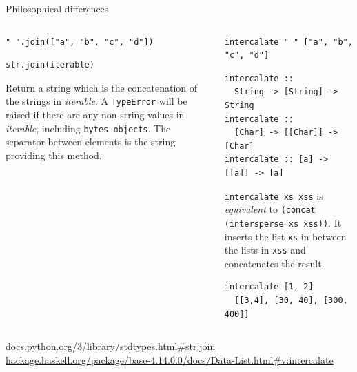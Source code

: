\documentclass[8pt]{beamer}
\begin{document}
\begin{frame}[fragile]{Philosophical differences}

\pause

\begin{columns}%
\begin{column}{.48\textwidth}
\begin{verbatim}
" ".join(["a", "b", "c", "d"])
\end{verbatim}
\pause
\begin{verbatim}
str.join(iterable)
\end{verbatim}

Return a string which is the concatenation of the strings in \emph{iterable}. A
\verb|TypeError| will be raised if there are any non-string values in \emph{iterable},
including \verb|bytes objects|. The separator between elements is the string providing
this method.


\end{column}
%
\begin{column}{.48\textwidth}
\pause
\begin{verbatim}
intercalate " " ["a", "b", "c", "d"]
\end{verbatim}

\pause
\begin{verbatim}
intercalate :: 
  String -> [String] -> String
intercalate :: 
  [Char] -> [[Char]] -> [Char]
intercalate :: [a] -> [[a]] -> [a]
\end{verbatim}

\pause
\verb|intercalate xs xss| is \emph{equivalent} to \verb|(concat (intersperse xs xss))|.
It inserts the list \verb|xs| in between the lists in \verb|xss| and concatenates the result.

\pause

\begin{verbatim}
intercalate [1, 2] 
  [[3,4], [30, 40], [300, 400]]
\end{verbatim}

\end{column}
\end{columns}

\pause
{\tiny \url{docs.python.org/3/library/stdtypes.html#str.join}}
{\tiny \url{hackage.haskell.org/package/base-4.14.0.0/docs/Data-List.html#v:intercalate}}

\end{frame}
\end{document}
